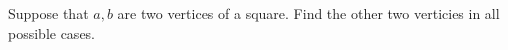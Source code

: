 Suppose that $a, b$ are two vertices of a square. Find the other two verticies in all possible cases.\\
